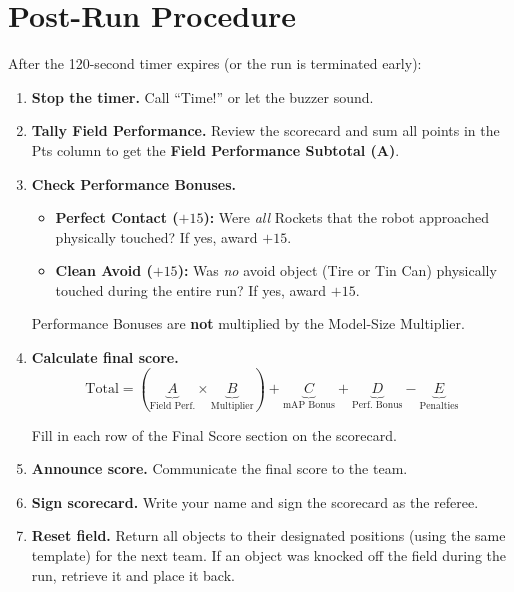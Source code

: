 \documentclass[a4]{article}
\begin{document}
\pagebreak
\section*{Post-Run Procedure}

After the 120-second timer expires (or the run is terminated early):

\begin{enumerate}
    \item \textbf{Stop the timer.} Call ``Time!'' or let the buzzer sound.

    \item \textbf{Tally Field Performance.} Review the scorecard and sum all points in the Pts column to get the \textbf{Field Performance Subtotal (A)}.

    \item \textbf{Check Performance Bonuses.}
    \begin{itemize}
        \item \textbf{Perfect Contact ($+15$):} Were \textit{all} Rockets that the robot approached physically touched? If yes, award $+15$.
        \item \textbf{Clean Avoid ($+15$):} Was \textit{no} avoid object (Tire or Tin Can) physically touched during the entire run? If yes, award $+15$.
    \end{itemize}
    Performance Bonuses are \textbf{not} multiplied by the Model-Size Multiplier.

    \item \textbf{Calculate final score.}
    \begin{equation*}
    \text{Total} = (\underbrace{A}_{\text{Field Perf.}} \times \underbrace{B}_{\text{Multiplier}}) + \underbrace{C}_{\text{mAP Bonus}} + \underbrace{D}_{\text{Perf.\ Bonus}} - \underbrace{E}_{\text{Penalties}}
    \end{equation*}

    Fill in each row of the Final Score section on the scorecard.

    \item \textbf{Announce score.} Communicate the final score to the team.

    \item \textbf{Sign scorecard.} Write your name and sign the scorecard as the referee.

    \item \textbf{Reset field.} Return all objects to their designated positions (using the same template) for the next team. If an object was knocked off the field during the run, retrieve it and place it back.
\end{enumerate}
\end{document}
